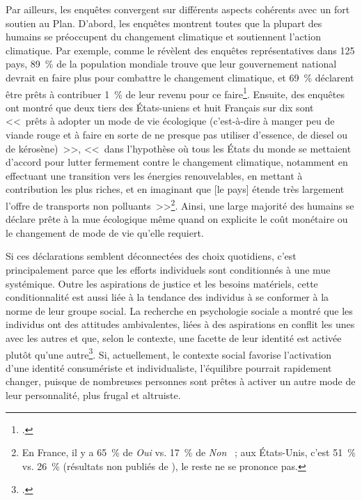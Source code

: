 \documentclass[a5paper,french,openany]{memoir}
\begin{document}
Par ailleurs, les enquêtes convergent sur différents aspects cohérents avec un fort soutien au Plan. D'abord, les enquêtes montrent toutes que la plupart des humains se préoccupent du changement climatique et soutiennent l'action climatique. Par exemple, comme le révèlent des enquêtes représentatives dans 125 pays, 89~\% de la population mondiale trouve que leur gouvernement national devrait en faire plus pour combattre le changement climatique, et 69~\% déclarent être prêts à contribuer 1~\% de leur revenu pour ce faire\footnote{\cite{andre_globally_2024}.}. %
Ensuite, des enquêtes ont montré que deux tiers des États-uniens et huit Français sur dix sont <<~prêts à adopter un mode de vie écologique (c'est-à-dire à manger peu de viande rouge et à faire en sorte de ne presque pas utiliser d'essence, de diesel ou de
kérosène)~>>, <<~dans l'hypothèse où tous les États du monde se mettaient d'accord pour lutter fermement contre le changement climatique, notamment en effectuant une
transition vers les énergies renouvelables, en mettant à contribution les plus riches, et en imaginant que [le pays] étende très largement l'offre de transports non polluants~>>\footnote{En France, il y a 65~\% de \textit{Oui} vs. 17~\% de \textit{Non} \citep{douenne_french_2020}~; aux États-Unis, c'est 51~\% vs. 26~\% (résultats non publiés de \citealp{dechezlepretre_fighting_2022}), le reste ne se prononce pas.}. %
Ainsi, une large majorité des humains se déclare prête à la mue écologique même quand on explicite le coût monétaire ou le changement de mode de vie qu'elle requiert. 

Si ces déclarations semblent déconnectées des choix quotidiens, c'est principalement parce que les efforts individuels sont conditionnés à une mue systémique. Outre les aspirations de justice et les besoins matériels, cette conditionnalité est aussi liée à la tendance des individus à se conformer à la norme de leur groupe social. La recherche en psychologie sociale a montré que les individus ont des attitudes ambivalentes, liées à des aspirations en conflit les unes avec les autres et que, selon le contexte, une facette de leur identité est activée plutôt qu'une autre\footnote{\cite{fielding_social_2016}.}. %
Si, actuellement, le contexte social favorise l'activation d'une identité consumériste et individualiste, l'équilibre pourrait rapidement changer, puisque de nombreuses personnes sont prêtes à activer un autre mode de leur personnalité, plus frugal et altruiste.
\end{document}
